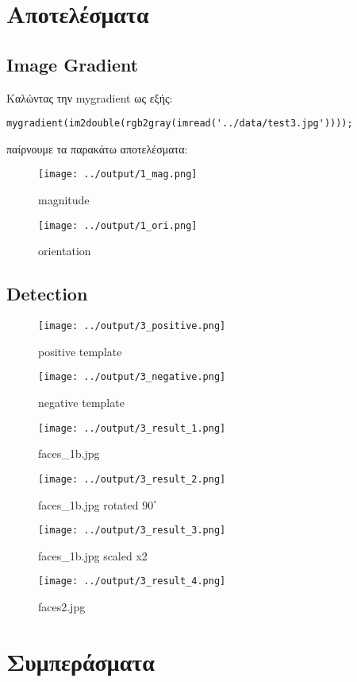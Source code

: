 \documentclass[11pt]{scrartcl} %
\begin{document}
\section{Αποτελέσματα}

\subsection{Image Gradient}

Καλώντας την mygradient ως εξής:

\begin{verbatim}
mygradient(im2double(rgb2gray(imread('../data/test3.jpg'))));
\end{verbatim}

παίρνουμε τα παρακάτω αποτελέσματα:

\begin{figure}[H]
  \texttt{[image: ../output/1\_mag.png]}
  \caption{magnitude}
\end{figure}

\begin{figure}[H]
  \texttt{[image: ../output/1\_ori.png]}
  \caption{orientation}
\end{figure}

\subsection{Detection}

\begin{figure}[H]
  \texttt{[image: ../output/3\_positive.png]}
  \caption{positive template}
\end{figure}

\begin{figure}[H]
  \texttt{[image: ../output/3\_negative.png]}
  \caption{negative template}
\end{figure}

\begin{figure}[H]
  \texttt{[image: ../output/3\_result\_1.png]}
  \caption{faces\_1b.jpg}
\end{figure}

\begin{figure}[H]
  \texttt{[image: ../output/3\_result\_2.png]}
  \caption{faces\_1b.jpg rotated $90^{\circ}$}
\end{figure}

\begin{figure}[H]
  \texttt{[image: ../output/3\_result\_3.png]}
  \caption{faces\_1b.jpg scaled x2}
\end{figure}

\begin{figure}[H]
  \texttt{[image: ../output/3\_result\_4.png]}
  \caption{faces2.jpg}
\end{figure}

\section{Συμπεράσματα}
\end{document}

